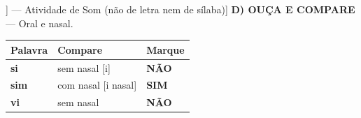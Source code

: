 \begin{exercicio}[Som /i/ nasal [[i~]] --- Atividade de Som (não de letra nem de sílaba)]
\textbf{D) OUÇA E COMPARE} --- Oral e nasal.

\begin{center}
\begin{tabular}{@{}p{4.2cm}p{6.2cm}p{1.6cm}@{}}
\hline
\textbf{Palavra} & \textbf{Compare} & \textbf{Marque} \\
\hline
\textbf{si} & sem nasal [i] & \textbf{NÃO} \\
\textbf{sim} & com nasal [i nasal] & \textbf{SIM} \\
\textbf{vi} & sem nasal & \textbf{NÃO} \\
\hline
\end{tabular}
\end{center}

\end{exercicio}

